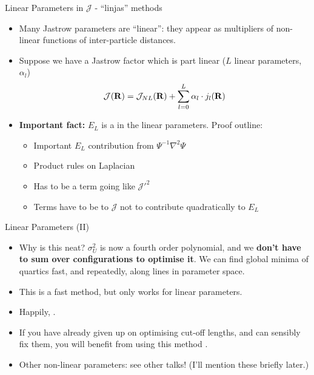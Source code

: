 \documentclass[12pt, pdf, hyperref={draft}, usenames, dvipsnames,
aspectratio=169]{beamer}
\newcommand{\red}[1]{{\bf\color{LancsRed}{#1}}}
\newcommand{\green}[1]{{\bf\color{ForestGreen}{#1}}}
\begin{document}
\begin{frame}{Linear Parameters in $\mathcal{J}$ - ``linjas''
methods}
\begin{itemize}
  \item Many Jastrow parameters are ``linear'': they appear as
  multipliers of non-linear functions of inter-particle distances.
  \item Suppose we have a Jastrow factor which is part linear ($L$ linear
  parameters, $\alpha_l$)
  \begin{equation}
    \mathcal{J}({\bf R}) = \mathcal{J}_{NL}({\bf R}) + \sum^{L}_{l=0}\alpha_l
    \cdot j_l({\bf R})
  \end{equation}
  \item \textbf{Important fact:} $E_L$ is a \green{second order polynomial} in
  the linear parameters. Proof outline:
  \begin{itemize}
    \item Important $E_L$ contribution from $\Psi^{-1}\nabla^2\Psi$
    \item Product rules on Laplacian
    \item Has to be a term going like $\mathcal{J}'^2$
    \item Terms have to be \red{trivial offsets} to $\mathcal{J}$ not to
    contribute quadratically to $E_L$
  \end{itemize}
\end{itemize}
\end{frame}


\begin{frame}{Linear Parameters (II)}
\begin{itemize}
  \item Why is this neat? $\sigma^2_{U}$ is now a fourth order polynomial, and
  we \textbf{don't have to sum over configurations to optimise it}. We can find
  global minima of quartics fast, and repeatedly, along lines in parameter
  space.
  \item This is a \green{very} fast method, but only works for linear
  parameters.
  \item Happily, \green{most parameters in the Jastrow factor are linear}.
  \item If you have already given up on optimising cut-off lengths, and can
  sensibly fix them, you will benefit from using this method \green{greatly}.
  \item Other non-linear parameters: see other talks! (I'll mention these
  briefly later.)
\end{itemize}
\end{frame}
\end{document}
